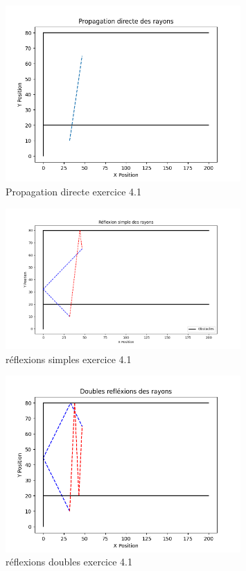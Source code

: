 \begin{figure}[H]
    \centering
    \includegraphics[width=0.8\textwidth]{Pictures/propa_dir.png}
    \caption{Propagation directe exercice 4.1}
    \label{fig:propd}
\end{figure}
\begin{figure}[H]
    \centering
    \includegraphics[width=0.8\textwidth]{Pictures/simple_reflex.png}
    \caption{réflexions simples exercice 4.1}
    \label{refs}
\end{figure}
\begin{figure}[H]
    \centering
    \includegraphics[width=0.8\textwidth]{Pictures/double_reflex.png}
    \caption{réflexions doubles exercice 4.1}
    \label{refd}
\end{figure}
